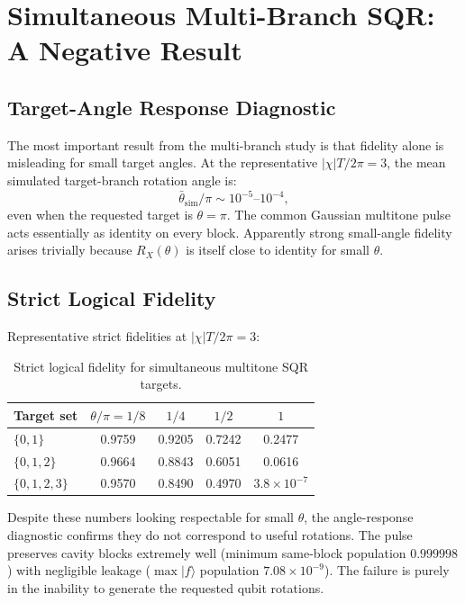 \documentclass[aps,pra,twocolumn,reprint,amsmath,amssymb]{revtex4-2}
\begin{document}
\section{Simultaneous Multi-Branch SQR: A Negative Result}

\subsection{Target-Angle Response Diagnostic}

The most important result from the multi-branch study is that fidelity alone is misleading for small target angles. At the representative $|\chi|T/2\pi=3$, the mean simulated target-branch rotation angle is:
\begin{equation}
\bar{\theta}_\mathrm{sim}/\pi \sim 10^{-5}\text{--}10^{-4},
\end{equation}
even when the requested target is $\theta=\pi$. The common Gaussian multitone pulse acts essentially as identity on every block. Apparently strong small-angle fidelity arises trivially because $R_X(\theta)$ is itself close to identity for small $\theta$.

\subsection{Strict Logical Fidelity}

Representative strict fidelities at $|\chi|T/2\pi=3$:

\begin{table}[tp]
\centering
\caption{Strict logical fidelity for simultaneous multitone SQR targets.}
\begin{tabular}{@{} l c c c c @{}}
\toprule
Target set & $\theta/\pi=1/8$ & $1/4$ & $1/2$ & $1$ \\
\midrule
$\{0,1\}$ & 0.9759 & 0.9205 & 0.7242 & 0.2477 \\
$\{0,1,2\}$ & 0.9664 & 0.8843 & 0.6051 & 0.0616 \\
$\{0,1,2,3\}$ & 0.9570 & 0.8490 & 0.4970 & $3.8\times 10^{-7}$ \\
\bottomrule
\end{tabular}
\label{tab:multibranch_strict}
\end{table}

Despite these numbers looking respectable for small $\theta$, the angle-response diagnostic confirms they do not correspond to useful rotations. The pulse preserves cavity blocks extremely well (minimum same-block population $0.999998$) with negligible leakage ($\max|f\rangle$ population $7.08\times 10^{-9}$). The failure is purely in the inability to generate the requested qubit rotations.
\end{document}
